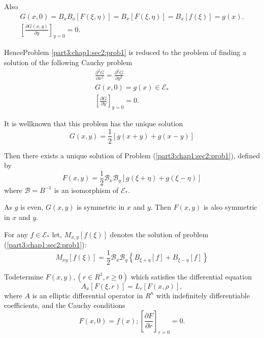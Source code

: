 Also
\begin{gather*}
  G(x, 0) = B_x B_o [ F( \xi,  \eta )] = B_x [ F( \xi,  \eta )] = B_x
  [f(\xi ) ] = g(x).\\ 
  \left[ \frac{\partial G(x, y)}{ \partial y}\right]_{y =0} = 0.
\end{gather*}

Hence\pageoriginale Problem \ref{part3:chap1:sec2:prob1} is reduced to
the problem of finding a solution of the following Cauchy problem 
\begin{gather*}
  \frac{\partial^2 G}{\partial x^2} = \frac{\partial^2 G}{\partial y^2}\\
  G(x, 0)  = g (x) \in \mathscr{E}_*\\
  \left[ \frac{\partial G}{\partial y} \right]_{y = 0} = 0.
\end{gather*}

It is wellknown that this problem has the unique solution 
\begin{equation*}
  G(x, y) = \frac{1}{2}\left[g(x + y) + g(x - y)\right]
  \tag{4}\label{part3:chap1:sec2:eq4} 
\end{equation*}

Then there exists a unique solution of Problem
(\ref{part3:chap1:sec2:prob1}), defined by  
\begin{equation*}
  F(x, y) = \frac{1}{2} \mathscr{B}_x \mathscr{B}_y [ g(\xi + \eta ) +
    g(\xi - \eta )] \tag{5}\label{part3:chap1:sec2:eq5} 
\end{equation*}
where $\mathscr{B}= B^{-1}$ is an isomorphism of $\mathscr{E}_*$.

\begin{remark*}
  As $g$ is even, $G(x, y)$ is symmetric in $x$ and $y$. Then $F(x,
  y)$ is also symmetric in $x$ and $y$. 
\end{remark*}

\setcounter{defn}{0}
\begin{defn}\label{part3:chap1:sec2:def1}%
  For any $f \in \mathscr{E}_*$ let, $M_{x,y}\left[ f(\xi)\right]$
  denotes the solution of problem (\ref{part3:chap1:sec2:prob1}): 
  \begin{equation*}
    M_{xy} [f(\xi )] = \frac{1}{2} \mathscr{B}_x \mathscr{B}_y \left\{
    B_{\xi + \eta} [f]+ B_{\xi - \eta }[f] \right\}
    \tag{6}\label{part3:chap1:sec2:eq6} 
  \end{equation*}
\end{defn}

\begin{prob}\label{part3:chap1:sec2:prob2}%
  To\pageoriginale determine $F(x, y), (r \in R^1, r \geq 0)$ which
  satisfies the differential equation 
  $$
  A_x [F(\xi, r)] = L_r [F(x, \rho)],
  $$
  where $A$ is an elliptic differential operator in $R^n$ with
  indefinitely differentiable coefficients, and the Cauchy conditions
  $$
  F(x, 0) = f(x); \left[\frac{\partial F}{\partial r}\right]_{r=0}=0.
  $$
\end{prob}

